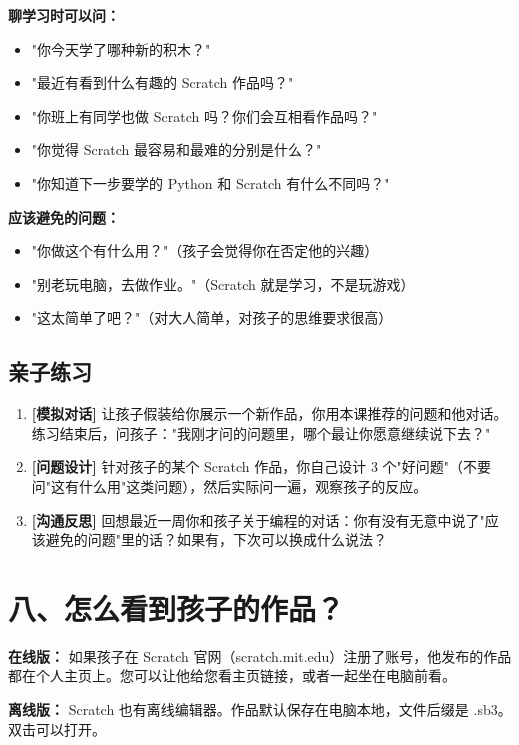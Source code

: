 \documentclass[a4paper,12pt]{ctexart}
\begin{document}
\textbf{聊学习时可以问：}
\begin{itemize}
  \item "你今天学了哪种新的积木？"
  \item "最近有看到什么有趣的 Scratch 作品吗？"
  \item "你班上有同学也做 Scratch 吗？你们会互相看作品吗？"
  \item "你觉得 Scratch 最容易和最难的分别是什么？"
  \item "你知道下一步要学的 Python 和 Scratch 有什么不同吗？"
\end{itemize}

\textbf{应该避免的问题：}
\begin{itemize}
  \item "你做这个有什么用？"（孩子会觉得你在否定他的兴趣）
  \item "别老玩电脑，去做作业。"（Scratch 就是学习，不是玩游戏）
  \item "这太简单了吧？"（对大人简单，对孩子的思维要求很高）
\end{itemize}

\subsection*{亲子练习}

\begin{enumerate}
  \item \textbf{[模拟对话]} 让孩子假装给你展示一个新作品，你用本课推荐的问题和他对话。练习结束后，问孩子："我刚才问的问题里，哪个最让你愿意继续说下去？"
  \item \textbf{[问题设计]} 针对孩子的某个 Scratch 作品，你自己设计 3 个"好问题"（不要问"这有什么用"这类问题），然后实际问一遍，观察孩子的反应。
  \item \textbf{[沟通反思]} 回想最近一周你和孩子关于编程的对话：你有没有无意中说了"应该避免的问题"里的话？如果有，下次可以换成什么说法？
\end{enumerate}

\section*{八、怎么看到孩子的作品？}

\textbf{在线版：} 如果孩子在 Scratch 官网（scratch.mit.edu）注册了账号，他发布的作品都在个人主页上。您可以让他给您看主页链接，或者一起坐在电脑前看。

\textbf{离线版：} Scratch 也有离线编辑器。作品默认保存在电脑本地，文件后缀是 .sb3。双击可以打开。
\end{document}
